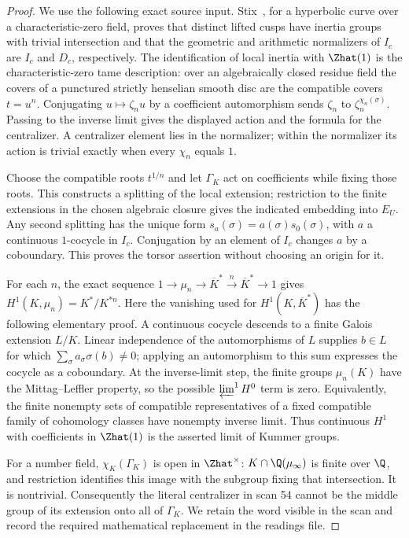 \begin{proof}
We use the following exact source input. Stix~\cite[Proposition 11 and Corollary 12]{Stix2008}, for a hyperbolic curve over a characteristic-zero field, proves that distinct lifted cusps have inertia groups with trivial intersection and that the geometric and arithmetic normalizers of $I_c$ are $I_c$ and $D_c$, respectively. The identification of local inertia with $\Zhat(1)$ is the characteristic-zero tame description: over an algebraically closed residue field the covers of a punctured strictly henselian smooth disc are the compatible covers $t=u^n$. Conjugating $u\mapsto\zeta_nu$ by a coefficient automorphism sends $\zeta_n$ to $\zeta_n^{\chi_n(\sigma)}$. Passing to the inverse limit gives the displayed action and the formula for the centralizer. A centralizer element lies in the normalizer; within the normalizer its action is trivial exactly when every $\chi_n$ equals $1$.

Choose the compatible roots $t^{1/n}$ and let $\Gamma_K$ act on coefficients while fixing those roots. This constructs a splitting of the local extension; restriction to the finite extensions in the chosen algebraic closure gives the indicated embedding into $E_U$. Any second splitting has the unique form $s_a(\sigma)=a(\sigma)s_0(\sigma)$, with $a$ a continuous $1$-cocycle in $I_c$. Conjugation by an element of $I_c$ changes $a$ by a coboundary. This proves the torsor assertion without choosing an origin for it.

For each $n$, the exact sequence $1\to\mu_n\to\overline K^*\xrightarrow{n}\overline K^*\to1$ gives $H^1(K,\mu_n)=K^*/K^{*n}$. Here the vanishing used for $H^1(K,\overline K^*)$ has the following elementary proof. A continuous cocycle descends to a finite Galois extension $L/K$. Linear independence of the automorphisms of $L$ supplies $b\in L$ for which $\sum_\sigma a_\sigma\sigma(b)\ne0$; applying an automorphism to this sum expresses the cocycle as a coboundary. At the inverse-limit step, the finite groups $\mu_n(K)$ have the Mittag--Leffler property, so the possible $\varprojlim^1 H^0$ term is zero. Equivalently, the finite nonempty sets of compatible representatives of a fixed compatible family of cohomology classes have nonempty inverse limit. Thus continuous $H^1$ with coefficients in $\Zhat(1)$ is the asserted limit of Kummer groups.

For a number field, $\chi_K(\Gamma_K)$ is open in $\Zhat^\times$: $K\cap\Q(\mu_\infty)$ is finite over $\Q$, and restriction identifies this image with the subgroup fixing that intersection. It is nontrivial. Consequently the literal centralizer in scan 54 cannot be the middle group of its extension onto all of $\Gamma_K$. We retain the word visible in the scan and record the required mathematical replacement in the readings file.
\end{proof}

